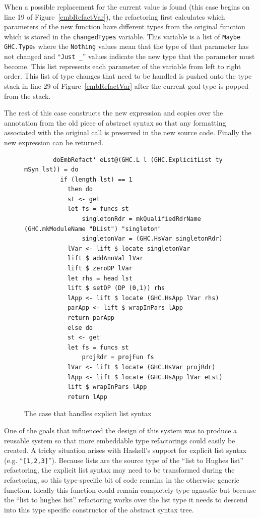 When a possible replacement for the current value is found (this case begins on line 19 of Figure~\ref{embRefactVar}), the refactoring first calculates which parameters of the new function have different types from the original function which is stored in the \texttt{changedTypes} variable. This variable is a list of \texttt{Maybe GHC.Type}s where the \texttt{Nothing} values mean that the type of that parameter has not changed and ``\texttt{Just \_}'' values indicate the new type that the parameter must become. This list represents each parameter of the variable from left to right order. This list of type changes that need to be handled is pushed onto the type stack in line 29 of Figure~\ref{embRefactVar} after the current goal type is popped from the stack. 

The rest of this case constructs the new expression and copies over the annotation from the old piece of abstract syntax so that any formatting associated with the original call is preserved in the new source code. Finally the new expression can be returned.

\begin{figure}[t]
\begin{lstlisting}
        doEmbRefact' eLst@(GHC.L l (GHC.ExplicitList ty mSyn lst)) = do
          if (length lst) == 1
            then do
            st <- get
            let fs = funcs st
                singletonRdr = mkQualifiedRdrName (GHC.mkModuleName "DList") "singleton"
                singletonVar = (GHC.HsVar singletonRdr)
            lVar <- lift $ locate singletonVar
            lift $ addAnnVal lVar
            lift $ zeroDP lVar
            let rhs = head lst
            lift $ setDP (DP (0,1)) rhs
            lApp <- lift $ locate (GHC.HsApp lVar rhs)
            parApp <- lift $ wrapInPars lApp
            return parApp
            else do
            st <- get
            let fs = funcs st
                projRdr = projFun fs
            lVar <- lift $ locate (GHC.HsVar projRdr)
            lApp <- lift $ locate (GHC.HsApp lVar eLst)
            lift $ wrapInPars lApp
            return lApp
\end{lstlisting}
\caption{The case that handles explicit list syntax}
\label{embRefactExpLst}
\end{figure}

One of the goals that influenced the design of this system was to produce a reusable system so that more embeddable type refactorings could easily be created. A tricky situation arises with Haskell's support for explicit list syntax (e.g. ``\texttt{[1,2,3]}''). Because lists are the source type of the ``list to Hughes list'' refactoring, the explicit list syntax may need to be transformed during the refactoring, so this type-specific bit of code remains in the otherwise generic function. Ideally this function could remain completely type agnostic but because the ``list to hughes list'' refactoring works over the list type it needs to descend into this type specific constructor of the abstract syntax tree.

